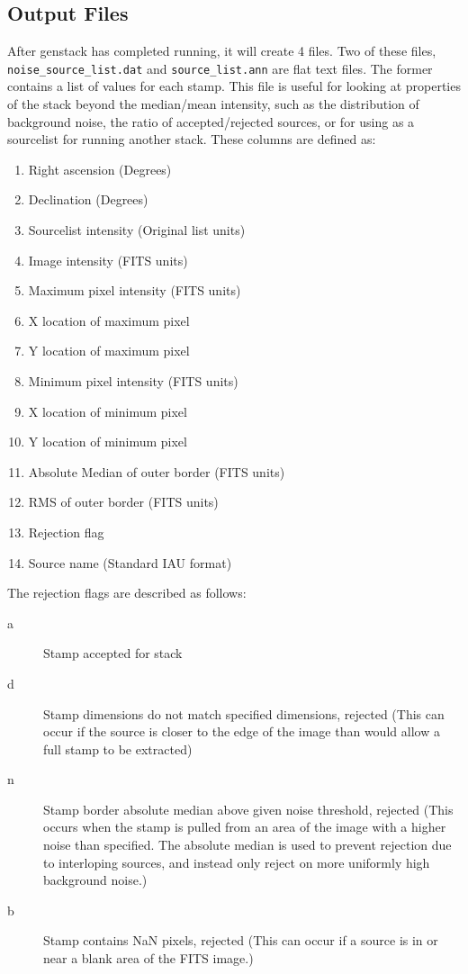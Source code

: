 \documentclass{article}
\begin{document}
\subsection{Output Files}
After genstack has completed running,  it will create 4 files.  Two of these 
files, \verb!noise_source_list.dat! and \verb!source_list.ann! are flat text 
files.  The former contains a list of values for each stamp.  This file is 
useful for looking at properties of the stack beyond the median/mean intensity,
such as the distribution of background noise, the ratio of accepted/rejected
sources, or for using as a sourcelist for running another stack.
These columns are defined as:
\begin{enumerate}
	\item Right ascension (Degrees)
	\item Declination (Degrees)
	\item Sourcelist intensity (Original list units)
	\item Image intensity (FITS units)
	\item Maximum pixel intensity (FITS units)
	\item X location of maximum pixel
	\item Y location of maximum pixel
	\item Minimum pixel intensity (FITS units)
	\item X location of minimum pixel
	\item Y location of minimum pixel
	\item Absolute Median of outer border (FITS units)
	\item RMS of outer border (FITS units)
	\item Rejection flag 
	\item Source name (Standard IAU format)\\
\end{enumerate} 
The rejection flags are described as follows:
\begin{description}
	\item[a] Stamp accepted for stack
	\item[d] Stamp dimensions do not match specified dimensions, rejected (This
	can occur if the source is closer to the edge of the image than would allow
	a full stamp to be extracted)
	\item[n] Stamp border absolute median above given noise threshold, rejected
	(This occurs when the stamp is pulled from an area of the image with a 
	higher noise than specified.  The absolute median is used to prevent 
	rejection due to interloping sources, and instead only reject on more 
	uniformly high background noise.)
	\item[b] Stamp contains NaN pixels, rejected (This can occur if a source is
	in or near a blank area of the FITS image.)
\end{description}
\end{document}
